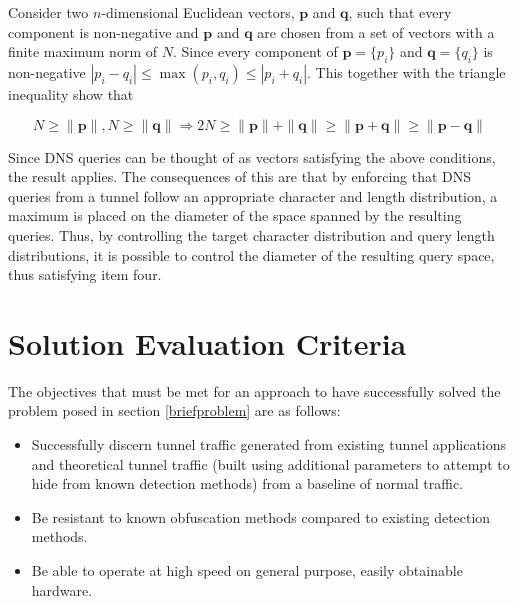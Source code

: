 \documentclass[12pt]{report}
\theoremstyle{remark}
\theoremstyle{definition}
\theoremstyle{definition}
\theoremstyle{definition}
\begin{document}

Consider two $n$-dimensional Euclidean vectors, $\mathbf p$ and $\mathbf q$,
such that every component is non-negative and $\mathbf p$ and $\mathbf q$ are
chosen from a set of vectors with a finite maximum norm of $N$. Since every
component of $\mathbf p=\{p_i\}$ and $\mathbf q=\{q_i\}$ is non-negative
$|p_i-q_i|\leq\max{(p_i,q_i)}\leq|p_i+q_i|$. This together with the triangle
inequality show that

\[N\geq\|\mathbf p\|,N\geq\|\mathbf q\|\Rightarrow 2N\geq\|\mathbf p\|+\|\mathbf q\|\geq\|\mathbf p+\mathbf q\|\geq\|\mathbf p-\mathbf q\|\]

Since DNS queries can be thought of as vectors satisfying the above conditions,
the result applies. The consequences of this are that by enforcing that DNS
queries from a tunnel follow an appropriate character and length distribution, a maximum is
placed on the diameter of the space spanned by the resulting queries. Thus, by
controlling the target character distribution and query length distributions, it
is possible to control the diameter of the resulting query space, thus
satisfying item four.

\section{Solution Evaluation Criteria} The objectives that must be met for an
approach to have successfully solved the problem posed in section
\ref{briefproblem} are as follows:

\begin{itemize} \item Successfully discern tunnel traffic generated from existing tunnel applications and theoretical tunnel traffic (built using additional parameters to attempt to hide from known detection methods) from a baseline of normal traffic.
\item Be resistant to known obfuscation methods compared to existing detection methods.
\item Be able to operate at high speed on general purpose, easily obtainable
hardware.
\end{itemize}
\end{document}
